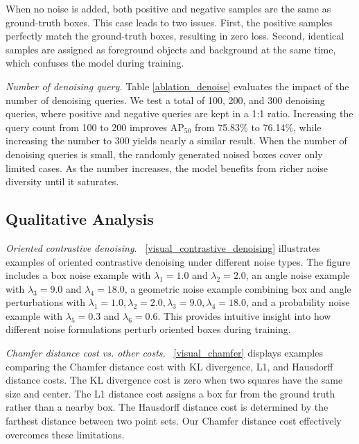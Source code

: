 \documentclass[lettersize,journal]{IEEEtran}
\begin{document}
\visualChamfer

When no noise is added, both positive and negative samples are the same as ground-truth boxes. This case leads to two issues. First, the positive samples perfectly match the ground-truth boxes, resulting in zero loss. Second, identical samples are assigned as foreground objects and background at the same time, which confuses the model during training.

\textit{Number of denoising query.}
Table \ref{ablation_denoise} evaluates the impact of the number of denoising queries. We test a total of 100, 200, and 300 denoising queries, where positive and negative queries are kept in a 1:1 ratio. Increasing the query count from 100 to 200 improves AP$_{50}$ from 75.83\% to 76.14\%, while increasing the number to 300 yields nearly a similar result. When the number of denoising queries is small, the randomly generated noised boxes cover only limited cases. As the number increases, the model benefits from richer noise diversity until it saturates.







\subsection{Qualitative Analysis}

\textit{Oriented contrastive denoising.}
\figurename~\ref{visual_contrastive_denoising} illustrates examples of oriented contrastive denoising under different noise types. The figure includes a box noise example with $\lambda_1=1.0$ and $\lambda_2=2.0$, an angle noise example with $\lambda_3=9.0$ and $\lambda_4=18.0$, a geometric noise example combining box and angle perturbations with $\lambda_1=1.0, \lambda_2=2.0, \lambda_3=9.0, \lambda_4=18.0$, and a probability noise example with $\lambda_5=0.3$ and $\lambda_6=0.6$. This provides intuitive insight into how different noise formulations perturb oriented boxes during training.


\textit{Chamfer distance cost vs. other costs.} \figurename~\ref{visual_chamfer} displays examples comparing the Chamfer distance cost with KL divergence, L1, and Hausdorff distance costs. The KL divergence cost is zero when two squares have the same size and center. The L1 distance cost assigns a box far from the ground truth rather than a nearby box. The Hausdorff distance cost is determined by the farthest distance between two point sets. Our Chamfer distance cost effectively overcomes these limitations.
\end{document}
